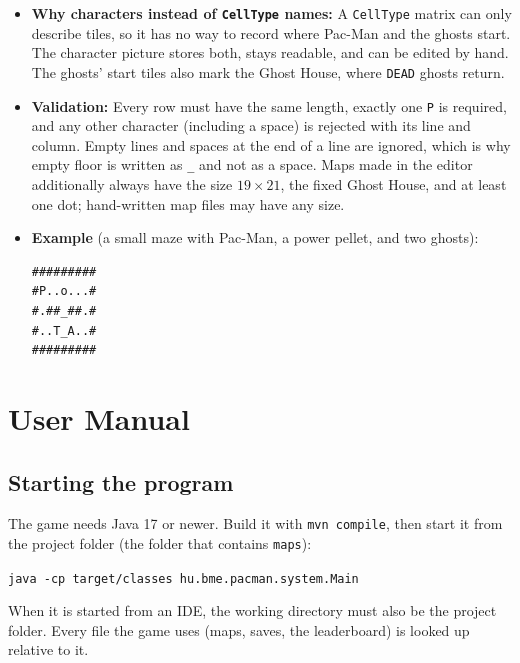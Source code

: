 \documentclass[11pt, a4paper]{article}
\begin{document}
\begin{itemize}
    \item \textbf{Why characters instead of \texttt{CellType} names:} A \texttt{CellType} matrix can only describe tiles, so it has no way to record where Pac-Man and the ghosts start. The character picture stores both, stays readable, and can be edited by hand. The ghosts' start tiles also mark the Ghost House, where \texttt{DEAD} ghosts return.
    \item \textbf{Validation:} Every row must have the same length, exactly one \texttt{P} is required, and any other character (including a space) is rejected with its line and column. Empty lines and spaces at the end of a line are ignored, which is why empty floor is written as \texttt{\_} and not as a space. Maps made in the editor additionally always have the size $19 \times 21$, the fixed Ghost House, and at least one dot; hand-written map files may have any size.
    \item \textbf{Example} (a small maze with Pac-Man, a power pellet, and two ghosts):

    \vspace{0.1cm}
\begin{verbatim}
#########
#P..o...#
#.##_##.#
#..T_A..#
#########
\end{verbatim}
\end{itemize}

\clearpage

\section{User Manual}
\label{sec:manual}

\subsection*{Starting the program}
The game needs Java 17 or newer. Build it with \texttt{mvn compile}, then start it from the project folder (the folder that contains \texttt{maps}):

\vspace{0.1cm}
\texttt{java -cp target/classes hu.bme.pacman.system.Main}
\vspace{0.1cm}

When it is started from an IDE, the working directory must also be the project folder. Every file the game uses (maps, saves, the leaderboard) is looked up relative to it.
\end{document}
